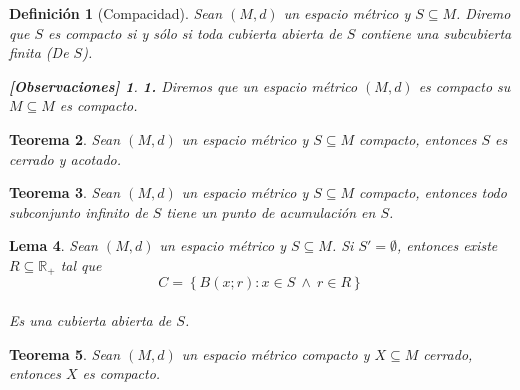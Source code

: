 \documentclass[oneside]{book} %
\theoremstyle{Teorema}
\newtheorem{Definicion}{Definición}[chapter]
\newtheorem{Teorema}[Definicion]{Teorema}
\newtheorem{Lema}[Definicion]{Lema}
\theoremstyle{Ejemplos}
\theoremstyle{[Obs]}
\newtheorem*{Obs}{[Observaciones]}
\renewcommand{\{}{\left\lbrace} %
\renewcommand{\}}{\right\rbrace} %
\newcommand{\y}{\ \wedge\ } %
\renewcommand{\sc}{\subseteq} %
\newcommand{\R}{\mathbb{R}} %
\begin{document}
			\begin{Definicion}[Compacidad]
				
				Sean $(M, d)$ un espacio métrico y $S \sc M$. Diremo que $S$ es compacto si y sólo si toda cubierta abierta de $S$ contiene una subcubierta finita (De $S$). \\

				\begin{Obs}
				
					\hfill
				
					\textbf{1.} Diremos que un espacio métrico $(M, d)$ es compacto su $M \sc M$ es compacto. \\
				
				\end{Obs}

			\end{Definicion}

			\begin{Teorema}
				
				Sean $(M, d)$ un espacio métrico y $S \sc M$ compacto, entonces $S$ es cerrado y acotado. \\

			\end{Teorema}

			\begin{Teorema}
				
				Sean $(M, d)$ un espacio métrico y $S \sc M$ compacto, entonces todo subconjunto infinito de $S$ tiene un punto de acumulación en $S$. \\

			\end{Teorema}

			\begin{Lema}

				Sean $(M, d)$ un espacio métrico y $S \sc M$. Si $S' = \emptyset$, entonces existe $R \sc \R_{+}$ tal que \\

				\[ C = \{ B(x;r) : x \in S \y r \in R \} \] \\

				Es una cubierta abierta de $S$. \\

			\end{Lema}

			\begin{Teorema}
				
				Sean $(M, d)$ un espacio métrico compacto y $X \sc M$ cerrado, entonces $X$ es compacto. \\

			\end{Teorema}
\end{document}
